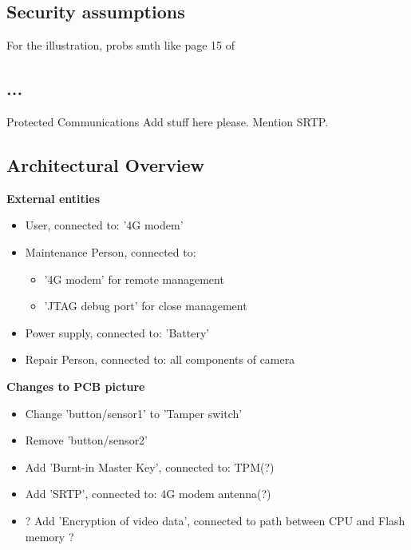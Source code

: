\documentclass[10pt]{article}
\begin{document}

    \subsection{Security assumptions}


	For the illustration, probs smth like page 15 of 
  \subsection{...}
    \begin{checklist}
	 {Protected Communications} {
	Add stuff here please. Mention SRTP.}
    \end{checklist}
	
	\newpage
	
	 \subsection{Architectural Overview}
	\textbf{External entities}
	\begin{itemize}
		\item User, connected to: '4G modem'
		\item Maintenance Person, connected to: 
		\begin{itemize}
			\item '4G modem' for remote management
			\item 'JTAG debug port' for close management
		\end{itemize}
		\item Power supply, connected to: 'Battery'
		\item Repair Person, connected to: all components of camera %
	\end{itemize}
	\textbf{Changes to PCB picture}
	\begin{itemize}
		\item Change 'button/sensor1' to 'Tamper switch' 
		\item Remove 'button/sensor2'
		\item Add 'Burnt-in Master Key', connected to: TPM(?)
		\item Add 'SRTP', connected to: 4G modem antenna(?)
		\item ? Add 'Encryption of video data', connected to path between CPU and Flash memory ? %
	\end{itemize}
	
\end{document}
